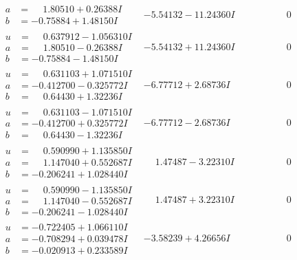 \documentclass[1p]{elsarticle_modified}
\theoremstyle{definition}
\begin{document}
$$\begin{array}{c|c|c}
\begin{aligned}
a &= \phantom{-}1.80510 + 0.26388 I \\
b &= -0.75884 + 1.48150 I\end{aligned}
 & -5.54132 - 11.24360 I & \phantom{-0.000000 } 0 \\ \hline\begin{aligned}
u &= \phantom{-}0.637912 - 1.056310 I \\
a &= \phantom{-}1.80510 - 0.26388 I \\
b &= -0.75884 - 1.48150 I\end{aligned}
 & -5.54132 + 11.24360 I & \phantom{-0.000000 } 0 \\ \hline\begin{aligned}
u &= \phantom{-}0.631103 + 1.071510 I \\
a &= -0.412700 - 0.325772 I \\
b &= \phantom{-}0.64430 + 1.32236 I\end{aligned}
 & -6.77712 + 2.68736 I & \phantom{-0.000000 } 0 \\ \hline\begin{aligned}
u &= \phantom{-}0.631103 - 1.071510 I \\
a &= -0.412700 + 0.325772 I \\
b &= \phantom{-}0.64430 - 1.32236 I\end{aligned}
 & -6.77712 - 2.68736 I & \phantom{-0.000000 } 0 \\ \hline\begin{aligned}
u &= \phantom{-}0.590990 + 1.135850 I \\
a &= \phantom{-}1.147040 + 0.552687 I \\
b &= -0.206241 + 1.028440 I\end{aligned}
 & \phantom{-}1.47487 - 3.22310 I & \phantom{-0.000000 } 0 \\ \hline\begin{aligned}
u &= \phantom{-}0.590990 - 1.135850 I \\
a &= \phantom{-}1.147040 - 0.552687 I \\
b &= -0.206241 - 1.028440 I\end{aligned}
 & \phantom{-}1.47487 + 3.22310 I & \phantom{-0.000000 } 0 \\ \hline\begin{aligned}
u &= -0.722405 + 1.066110 I \\
a &= -0.708294 + 0.039478 I \\
b &= -0.020913 + 0.233589 I\end{aligned}
 & -3.58239 + 4.26656 I & \phantom{-0.000000 } 0 \\ \hline\begin{aligned}

\end{aligned}
\end{array}$$
\end{document}
